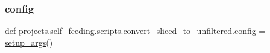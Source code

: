 \subsubsection{\texorpdfstring{config}{config}}
{\footnotesize\ttfamily def projects.\+self\+\_\+feeding.\+scripts.\+convert\+\_\+sliced\+\_\+to\+\_\+unfiltered.\+config = \hyperlink{namespaceprojects_1_1self__feeding_1_1scripts_1_1convert__sliced__to__unfiltered_a13c1e69c48c191e9cc6f8d257b79152d}{setup\+\_\+args}()}

